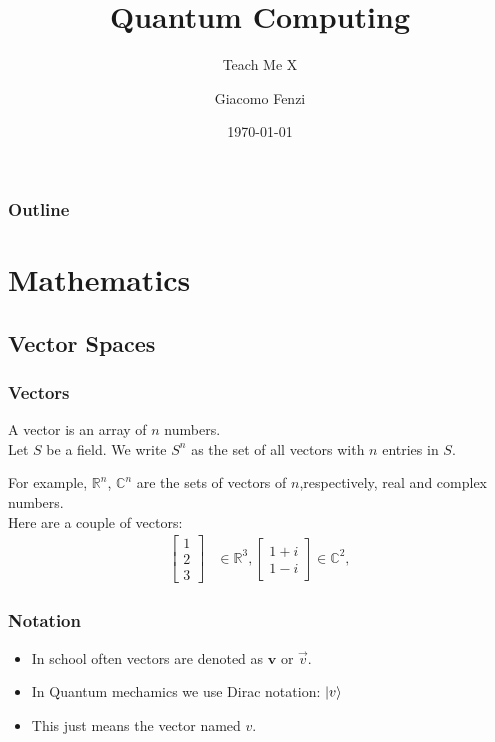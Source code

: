 \documentclass{beamer}
\title{Quantum Computing}
\subtitle{Teach Me X}
\author{Giacomo Fenzi}
\institute{University of St. Andrews}
\date{\today}
\begin{document}
    \begin{frame}
        \titlepage
    \end{frame}
    \begin{frame}
        \frametitle{Outline}
        \tableofcontents
    \end{frame}
    \section{Mathematics}
    \subsection{Vector Spaces}
    \begin{frame}
        \frametitle{Vectors}
        A vector is an array of $n$ numbers. \\
        Let $S$ be a field. We write $S^n$ as the set of all vectors with $n$ entries in $S$.
        \begin{example}
            For example, $\mathbb{R}^n$, $\mathbb{C}^n$  are the sets of vectors of $n$,respectively, real and complex numbers. \\
            Here are a couple of vectors:
            \begin{align}
                \begin{bmatrix}
                       1 \\
                       2 \\
                       3
                \end{bmatrix} &\in \mathbb{R}^3, 
                \begin{bmatrix}
                    1 + i \\
                    1 - i 
             \end{bmatrix} \in \mathbb{C}^2, 
              \end{align}
        \end{example}
    \end{frame}
    \begin{frame}
        \frametitle{Notation}
        \begin{itemize}
            \item In school often vectors are denoted as $\boldsymbol{v}$ or $\vec{v}$.
            \item In Quantum mechamics we use Dirac notation: $\ket{v}$
            \item This just means the vector named $v$. 
        \end{itemize}
    \end{frame}
\end{document}

